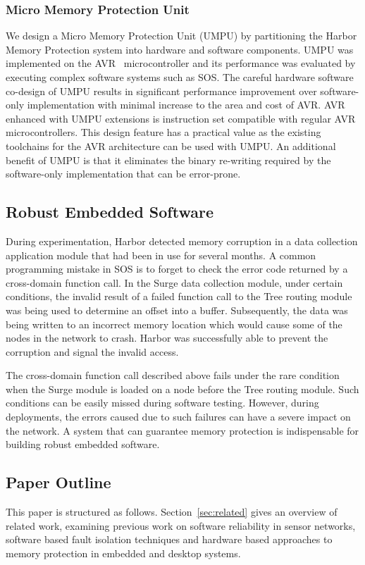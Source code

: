 \subsubsection{Micro Memory Protection Unit}
%
We design a Micro Memory Protection Unit (UMPU) by partitioning the
Harbor Memory Protection system into hardware and software components.
%
UMPU was implemented on the AVR~\cite{avrdatasheet} microcontroller and
its performance was evaluated by executing complex software systems
such as SOS.
%
The careful hardware software co-design of UMPU results in significant
performance improvement over software-only implementation with minimal
increase to the area and cost of AVR.
%
AVR enhanced with UMPU extensions is instruction set compatible with
regular AVR microcontrollers.
%
This design feature has a practical value as the existing
toolchains for the AVR architecture can be used with UMPU.
%
%
An additional benefit of UMPU is that it eliminates the binary
re-writing required by the software-only implementation that can be
error-prone.
%
%
\subsection{Robust Embedded Software}
%
During experimentation, Harbor detected memory corruption in a data
collection application module that had been in use for several months.
%
A common programming mistake in SOS is to forget to check the error code
returned by a cross-domain function call.
%
In the Surge data collection module, under certain conditions, the invalid result of a
failed function call to the Tree routing module was being used to
determine an offset into a buffer.
%
Subsequently, the data was being written to an incorrect memory
location which would cause some of the nodes in the network to crash.
%
Harbor was successfully able to prevent the corruption and signal the
invalid access.
%


The cross-domain function call described above fails under the rare
condition when the Surge module is loaded on a node before the Tree
routing module.
%
Such conditions can be easily missed during software testing.
%
However, during deployments, the errors caused due to such failures
can have a severe impact on the network.
%
A system that can guarantee memory protection is indispensable for
building robust embedded software.
%
\subsection{Paper Outline}
%
This paper is structured as follows.
%
Section~\ref{sec:related} gives an overview of related work,
examining previous work on software reliability in sensor networks,
software based fault isolation techniques and hardware based
approaches to memory protection in embedded and desktop systems.

